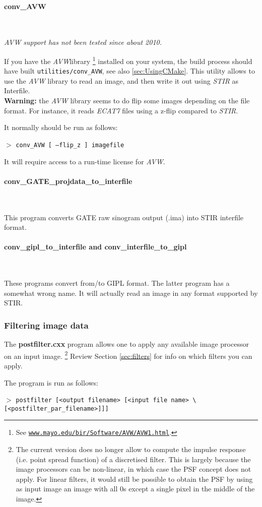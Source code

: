 \documentclass{article}
\def\url#1#2{\mbox{\href{#1}{\tt #2}}}
\newcommand{\subsubsubsection}[1]{\paragraph{#1}\mbox{} \\}
\newcommand{\cmdline}[1]{\par \noindent $>$ \texttt{#1}\par}
\begin{document}
{{{ \subsubsubsection{conv\_AVW}
}
\label{sec:convAVW}
\textit{AVW support has not been tested since about 2010.}

If you have the \textit{AVW}\texttrademark  library
\footnote{See \url{http://www.mayo.edu/bir/Software/AVW/AVW1.html}
{www.mayo.edu/bir/Software/AVW/AVW1.html}.
} installed on your system, the build process should have built \texttt{utilities/conv\_AVW},
see also \ref{sec:UsingCMake}.
This utility allows to use the \textit{AVW} library to read an image, and then write it out
using \textit{STIR} as Interfile.\\
\textbf{Warning:} the \textit{AVW} library seems to do flip some images depending
on the file format. For instance, it reads \textit{ECAT7} files using a z-flip compared
to \textit{STIR}.

It normally should be run as follows:
\cmdline{conv\_AVW [ --flip\_z ] imagefile}

It will require access to a run-time license for \textit{AVW}.

{ \subsubsubsection{conv\_GATE\_projdata\_to\_interfile}
}
This program converts GATE raw sinogram output (.ima) into STIR interfile format. 

{ \subsubsubsection{conv\_gipl\_to\_interfile and conv\_interfile\_to\_gipl}
}
These programs convert from/to GIPL format. The latter program has a somewhat wrong name.
It will actually read an image in any format supported by STIR.


\subsubsection{
Filtering image data}

The \textbf{postfilter.cxx} program allows one to apply any available 
image processor on an input image. \footnote{{\small The current version 
does no longer allow to compute the impulse response (i.e. point 
spread function) of a discretised filter. This is largely because 
the image processors can be non-linear, in which case the PSF 
concept does not apply. For linear filters, it would still be 
possible to obtain the PSF by using as input image an image with 
all 0s except a single pixel in the middle of the image.}} Review 
Section \ref{sec:filters} for info on which filters you can apply.


The program is run as follows:
\cmdline{postfilter [\texttt{<}output filename\texttt{>} [\texttt{<}input file 
name\texttt{>} {\textbackslash}\\
{[}\texttt{<}postfilter\_par\_filename\texttt{>}]]]}

}}
\end{document}
